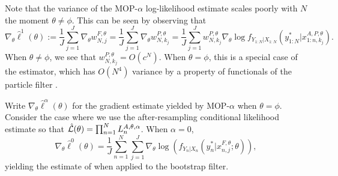 Note that the variance of the MOP-$\alpha$ log-likelihood estimate scales poorly with $N$ the moment $\theta\neq\phi$. 
This can be seen by observing that
\begin{equation}
    \nabla_\theta \hat{\ell}^1(\theta) := \frac{1}{J}\sum_{j=1}^J \nabla_\theta w_{N,j}^{F,\theta} =\frac{1}{J}\sum_{j=1}^J \nabla_\theta w_{N,k_j}^{P,\theta} = \frac{1}{J}\sum_{j=1}^J w_{N,k_j}^{P,\theta} \nabla_\theta \log f_{Y_{1:N}|X_{1:N}}\left(y_{1:N}^* | x_{1:n,k_j}^{A, P,\theta}\right).
\end{equation}
When $\theta\neq\phi$, we see that $w_{N,k_j}^{P,\theta} = O(c^N)$. 
When $\theta=\phi$, this is a special case of the \cite{poyiadjis11} estimator, which has $O(N^4)$ variance by a property of functionals of the particle filter \cite{delMoral03}. 

\begin{lem}
\label{lem:mop-0-formula}

 Write $\nabla_\theta \hat\ell^\alpha(\theta)$ for the gradient estimate yielded by MOP-$\alpha$ when $\theta=\phi$. Consider the case where we use the after-resampling conditional likelihood estimate so that $\hat{\mathcal{L}}(\theta) = \prod_{n=1}^N L_n^{A, \theta, \alpha}$. When $\alpha=0$,
    \begin{equation}
        \nabla_\theta \hat\ell^0(\theta) 
        = \frac{1}{J} \sum_{n=1}^N \sum_{j=1}^J \nabla_\theta \log\left(f_{Y_n|X_{n}}(y_n^*|x_{n,j}^{F, \theta}; \theta)\right),
    \end{equation}
    yielding the estimate of \cite{naesseth18} when applied to the bootstrap filter. 
\end{lem}

